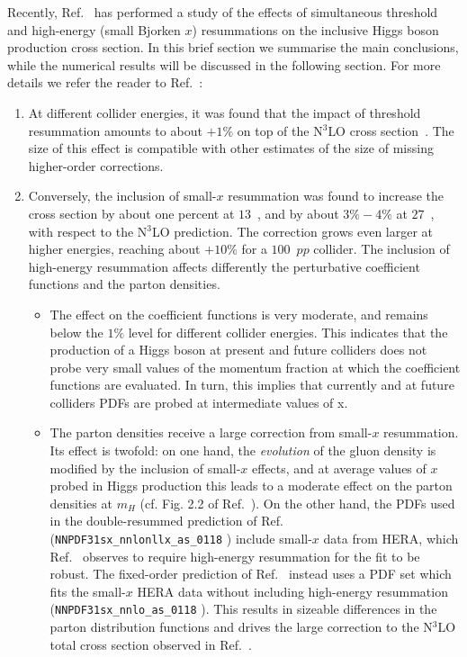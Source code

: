 Recently, Ref.~\cite{Bonvini:2018ixe} has performed a study of the
effects of simultaneous threshold and high-energy (small Bjorken $x$)
resummations on the inclusive Higgs boson production cross section. In this brief
section we summarise the main conclusions, while the numerical results
will be discussed in the following section. For more details we refer
the reader to Ref.~\cite{Bonvini:2018ixe}:
\begin{enumerate}
\item At different collider energies, it was found that the impact of
  threshold resummation amounts to about $+1\%$ on top of the N$^3$LO
  cross section~\cite{Bonvini:2016frm}. The size of this effect is
  compatible with other estimates of the size of missing higher-order
  corrections.
\item Conversely, the inclusion of small-$x$ resummation was found to
  increase the cross section by about one percent at $13$~\UTeV, and by
  about $3\%-4\%$ at $27$~\UTeV, with respect to the N$^3$LO
  prediction. The correction grows even larger at higher 
  energies, reaching about $+10\%$ for a $100$~\UTeV $pp$ collider. The
  inclusion of high-energy resummation affects differently the
  perturbative coefficient functions and the parton densities.
\begin{itemize}
\item The effect on the coefficient functions is very moderate, and
  remains below the $1\%$ level for different collider energies. This
  indicates that the production of a Higgs boson at present and future
  colliders does not probe very small values of the momentum fraction
  at which the coefficient functions are evaluated.
  In turn, this implies that currently and at future colliders PDFs are probed at intermediate values of x.

\item The parton densities receive a large correction from small-$x$
  resummation. Its effect is twofold: on one hand, the {\it evolution}
  of the gluon density is modified by the inclusion of small-$x$
  effects, and at average values of $x$ probed in Higgs production
  this leads to a moderate effect on the parton densities at $m_H$
  (cf. Fig. 2.2 of Ref.~\cite{Ball:2017otu}). On the other hand, the
  PDFs used in the double-resummed prediction of
  Ref.~\cite{Bonvini:2018ixe} (\verb+NNPDF31sx_nnlonllx_as_0118+
  \cite{Ball:2017otu}) include small-$x$ data from HERA, which
  Ref.~\cite{Ball:2017otu} observes to require high-energy resummation
  for the fit to be robust. The fixed-order prediction of
  Ref.~\cite{Bonvini:2018ixe} instead uses a PDF set which fits the
  small-$x$ HERA data without including high-energy resummation
  (\verb+NNPDF31sx_nnlo_as_0118+ \cite{Ball:2017otu}).  This results
  in sizeable differences in the parton distribution functions and
  drives the large correction to the N$^3$LO total cross section
  observed in Ref.~\cite{Bonvini:2018ixe}.
\end{itemize}
\end{enumerate}
